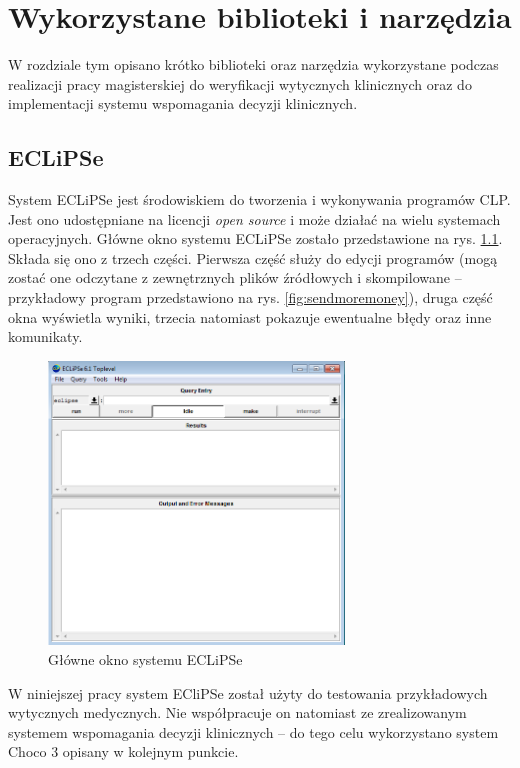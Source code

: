 \chapter{Wykorzystane biblioteki i narzędzia}

W rozdziale tym opisano krótko biblioteki oraz narzędzia wykorzystane podczas realizacji pracy magisterskiej do weryfikacji wytycznych klinicznych oraz do implementacji systemu wspomagania decyzji klinicznych. 

\section{ECLiPSe}
\label{sec:eclipse}

System ECLiPSe \cite{EclipseSite} jest środowiskiem do tworzenia i wykonywania programów CLP. Jest ono udostępniane na licencji \textit{open source} i może działać na wielu systemach operacyjnych. Główne okno systemu ECLiPSe zostało przedstawione na rys. \ref{fig:eclipse}. Składa się ono z trzech części. Pierwsza część służy do edycji programów (mogą zostać one odczytane z zewnętrznych plików źródłowych i skompilowane -- przykładowy program przedstawiono na rys. \ref{fig:sendmoremoney}), druga część okna wyświetla wyniki, trzecia natomiast pokazuje ewentualne błędy oraz inne komunikaty.
 
\begin{figure}[H]
\centering
\includegraphics[width=0.7\textwidth]{img/okno.png}
\caption{Główne okno systemu ECLiPSe}
\label{fig:eclipse}
\end{figure}

W niniejszej pracy system ECliPSe został użyty do testowania przykładowych wytycznych medycznych. Nie współpracuje on natomiast ze zrealizowanym systemem wspomagania decyzji klinicznych -- do tego celu wykorzystano system Choco 3 opisany w kolejnym punkcie. 

